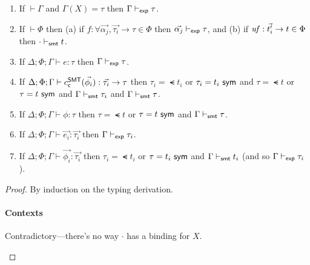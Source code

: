 \documentclass[acmsmall,screen,nonacm]{acmart}
\theoremstyle{definition}
\begin{document}
\begin{lemma}
\label{lem:regularity}
\begin{enumerate}

  \item \label{regularity:gamma} If $\vdash \Gamma$ and $\Gamma(X)
  = \tau$ then $\Gamma \vdash_{\mathsf{exp}} \tau$.

  \item \label{regularity:Phi} If $\vdash \Phi$ then (a) if $f
  : \forall \vec{\alpha_j}, \vec{\tau_i} \rightarrow \tau \in \Phi$
  then $\vec{\alpha_j} \vdash_{\mathsf{exp}} \tau$, and (b) if $\mathit{uf}
  : \vec{t_i'} \rightarrow t \in \Phi$ then $\cdot \vdash_{\mathsf{smt}} t$.

  \item \label{regularity:e} If $\Delta; \Phi; \Gamma \vdash e
  : \tau$ then $\Gamma \vdash_{\mathsf{exp}} \tau$.

  \item \label{regularity:c} If
  $\Delta; \Phi; \Gamma \vdash c^\mathsf{SMT}_{\mathsf{c}}(\vec{\phi_i})
  : \vec{\tau_i} \rightarrow \tau$ then $\tau_i = \smt{t_i}$ or
  $\tau_i = {t_i} ~ \mathsf{sym}$ and $\tau = \smt{t}$ or $\tau = {t} ~ \mathsf{sym}$ and
  $\Gamma \vdash_{\mathsf{smt}} \tau_i$ and
  $\Gamma \vdash_{\mathsf{smt}} \tau$.

  \item \label{regularity:phi} If $\Delta; \Phi; \Gamma \vdash \phi
  : \tau$ then $\tau = \smt{t}$ or $\tau = {t} ~ \mathsf{sym}$ and
  $\Gamma \vdash_{\mathsf{smt}} \tau$.

  \item \label{regularity:evec} If $\Delta; \Phi; \Gamma \vdash \vec{e_i}
  : \vec{\tau_i}$ then $\Gamma \vdash_{\mathsf{exp}} \tau_i$.

  \item \label{regularity:phivec} If
  $\Delta; \Phi; \Gamma \vdash \vec{\phi_i} : \vec{\tau_i}$ then
  $\tau_i = \smt{t_i}$ or $\tau = {t_i} ~ \mathsf{sym}$ and $\Gamma \vdash_{\mathsf{smt}}
  t_i$ (and so $\Gamma \vdash_{\mathsf{exp}} \tau_i$).
\end{enumerate}

\begin{proof}
  By induction on the typing derivation.
%
\paragraph*{Contexts}
%
\begin{proofcases}

  \item[(\rn{$\Gamma$-Empty})] Contradictory---there's no way $\cdot$
  has a binding for $X$.


\end{proofcases}
\end{proof}
\end{lemma}
\end{document}
